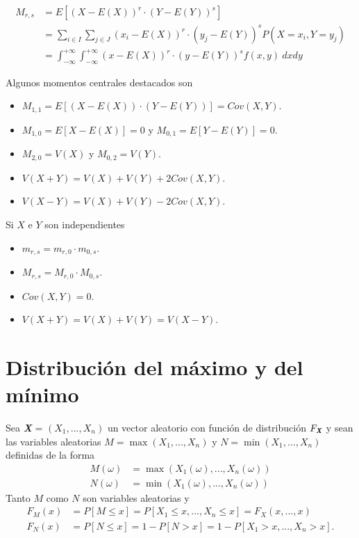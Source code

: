 \begin{defi}
    \begin{align*}
        M_{r,s} & = E[(X - E(X))^r \cdot (Y - E(Y))^s]                                                               \\
                & = \sum_{i\in I}{\sum_{j \in J}{(x_i - E(X))^r \cdot (y_j - E(Y))^sP(X = x_i, Y = y_j)}}            \\
                & = \int_{-\infty}^{+\infty}{\int_{-\infty}^{+\infty}{(x - E(X))^r \cdot (y - E(Y))^sf(x,y) \ dxdy}}
    \end{align*}
\end{defi}

Algunos momentos centrales destacados son
\begin{itemize}
    \item $M_{1,1} = E[(X - E(X)) \cdot (Y - E(Y))] = Cov(X,Y)$.
    \item $M_{1,0} = E[X - E(X)] = 0$ y $M_{0,1} = E[Y - E(Y)] = 0$.
    \item $M_{2,0} = V(X)$ y $M_{0,2} = V(Y)$.
\end{itemize}

\begin{obs}
    \begin{itemize}
        \item $V(X+Y) = V(X) + V(Y) + 2Cov(X,Y)$.
        \item $V(X-Y) = V(X) + V(Y) - 2Cov(X,Y)$.
    \end{itemize}
\end{obs}
Si $X$ e $Y$ son independientes
\begin{itemize}
    \item $m_{r,s} = m_{r,0} \cdot m_{0,s}$.
    \item $M_{r,s} = M_{r,0} \cdot M_{0,s}$.
    \item $Cov(X,Y) = 0$.
    \item $V(X + Y) = V(X) + V(Y) = V(X - Y)$.
\end{itemize}

\section{Distribución del máximo y del mínimo}

Sea \textit{\textbf{X}} = $(X_1,...,X_n)$ un vector aleatorio con función de distribución $F_{\textit{\textbf{X}}}$ y sean las variables aleatorias $M = \max(X_1,...,X_n)$ y $N = \min(X_1,...,X_n)$ definidas de la forma
\begin{align*}
    M(\omega) & = \max(X_1(\omega),...,X_n(\omega)) \\
    N(\omega) & = \min(X_1(\omega),...,X_n(\omega))
\end{align*}
Tanto $M$ como $N$ son variables aleatorias y
\begin{align*}
    F_M(x) & = P[M \leq x] = P[X_1 \leq x,..., X_n \leq x] = F_X(x,...,x) \\
    F_N(x) & = P[N \leq x] = 1 - P[N > x] = 1 - P[X_1 > x,...,X_n > x].
\end{align*}

